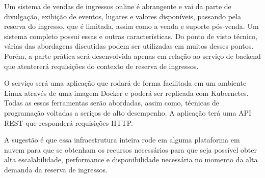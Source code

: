 Um sistema de vendas de ingressos online é abrangente e vai da parte de divulgação,
exibição de eventos, lugares e valores disponíveis, passando pela reserva do ingresso,
que é limitada, assim como a venda e suporte pós-venda. Um sistema completo possui essas
e outras características. Do ponto de visto técnico, várias das abordagens discutidas
podem ser utilizadas em muitos desses pontos. Porém, a parte prática será desenvolvida
apenas em relação ao serviço de backend que atentererá requisições do contexto de reserva
de ingressos.

O serviço será uma aplicação que rodará de forma facilitada em um ambiente Linux através
de uma imagem Docker e poderá ser replicada com Kubernetes. Todas as essas ferramentas
serão abordadas, assim como, técnicas de programação voltadas a seriços de alto
desempenho. A aplicação terá uma API REST que responderá requisições HTTP.

A sugestão é que essa infraestrutura inteira rode em alguma plataforma em nuvem para
que se obtenham os recursos necessários para que seja possível obter alta escalabilidade,
performance e disponibilidade necessária no momento da alta demanda da reserva de ingressos.

